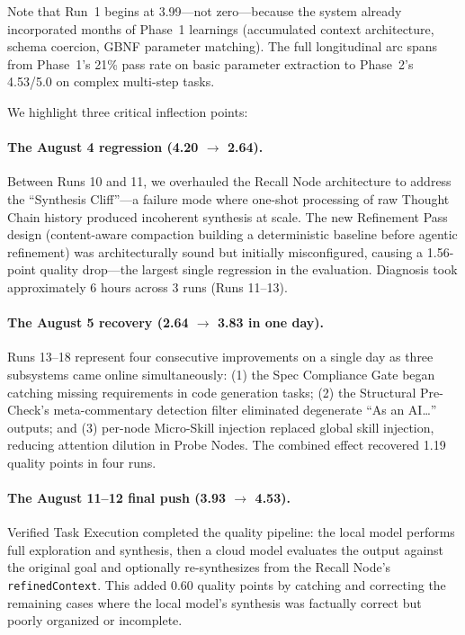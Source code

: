\documentclass{article}
\begin{document}
Note that Run~1 begins at 3.99---not zero---because the system already incorporated months of Phase~1 learnings (accumulated context architecture, schema coercion, GBNF parameter matching).
The full longitudinal arc spans from Phase~1's 21\% pass rate on basic parameter extraction to Phase~2's 4.53/5.0 on complex multi-step tasks.

We highlight three critical inflection points:

\paragraph{The August 4 regression (4.20 $\to$ 2.64).}
Between Runs 10 and 11, we overhauled the Recall Node architecture to address the ``Synthesis Cliff''---a failure mode where one-shot processing of raw Thought Chain history produced incoherent synthesis at scale.
The new Refinement Pass design (content-aware compaction building a deterministic baseline before agentic refinement) was architecturally sound but initially misconfigured, causing a 1.56-point quality drop---the largest single regression in the evaluation.
Diagnosis took approximately 6 hours across 3 runs (Runs 11--13).

\paragraph{The August 5 recovery (2.64 $\to$ 3.83 in one day).}
Runs 13--18 represent four consecutive improvements on a single day as three subsystems came online simultaneously:
(1) the Spec Compliance Gate began catching missing requirements in code generation tasks;
(2) the Structural Pre-Check's meta-commentary detection filter eliminated degenerate ``As an AI\ldots'' outputs;
and (3) per-node Micro-Skill injection replaced global skill injection, reducing attention dilution in Probe Nodes.
The combined effect recovered 1.19 quality points in four runs.

\paragraph{The August 11--12 final push (3.93 $\to$ 4.53).}
Verified Task Execution completed the quality pipeline: the local model performs full exploration and synthesis, then a cloud model evaluates the output against the original goal and optionally re-synthesizes from the Recall Node's \texttt{refinedContext}.
This added 0.60 quality points by catching and correcting the remaining cases where the local model's synthesis was factually correct but poorly organized or incomplete.
\end{document}
